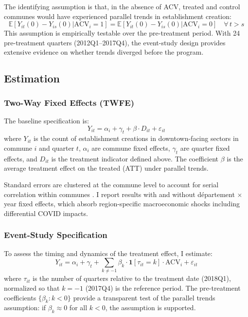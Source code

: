 \documentclass[12pt]{article}
\newcommand{\E}{\mathbb{E}}
\begin{document}
The identifying assumption is that, in the absence of ACV, treated and control communes would have experienced parallel trends in establishment creation:
\begin{equation}
\E[Y_{it}(0) - Y_{is}(0) | \text{ACV}_i = 1] = \E[Y_{it}(0) - Y_{is}(0) | \text{ACV}_i = 0] \quad \forall\, t > s
\label{eq:pt}
\end{equation}
This assumption is empirically testable over the pre-treatment period. With 24 pre-treatment quarters (2012Q1--2017Q4), the event-study design provides extensive evidence on whether trends diverged before the program.

\subsection{Estimation}

\subsubsection{Two-Way Fixed Effects (TWFE)}

The baseline specification is:
\begin{equation}
Y_{it} = \alpha_i + \gamma_t + \beta \cdot D_{it} + \varepsilon_{it}
\label{eq:twfe}
\end{equation}
where $Y_{it}$ is the count of establishment creations in downtown-facing sectors in commune $i$ and quarter $t$, $\alpha_i$ are commune fixed effects, $\gamma_t$ are quarter fixed effects, and $D_{it}$ is the treatment indicator defined above. The coefficient $\beta$ is the average treatment effect on the treated (ATT) under parallel trends.

Standard errors are clustered at the commune level to account for serial correlation within communes \citep{bertrand2004much}. I report results with and without d\'epartement $\times$ year fixed effects, which absorb region-specific macroeconomic shocks including differential COVID impacts.

\subsubsection{Event-Study Specification}

To assess the timing and dynamics of the treatment effect, I estimate:
\begin{equation}
Y_{it} = \alpha_i + \gamma_t + \sum_{k \neq -1} \beta_k \cdot \mathbf{1}[\tau_{it} = k] \cdot \text{ACV}_i + \varepsilon_{it}
\label{eq:event}
\end{equation}
where $\tau_{it}$ is the number of quarters relative to the treatment date (2018Q1), normalized so that $k = -1$ (2017Q4) is the reference period. The pre-treatment coefficients $\{\beta_k : k < 0\}$ provide a transparent test of the parallel trends assumption: if $\beta_k \approx 0$ for all $k < 0$, the assumption is supported.
\end{document}
